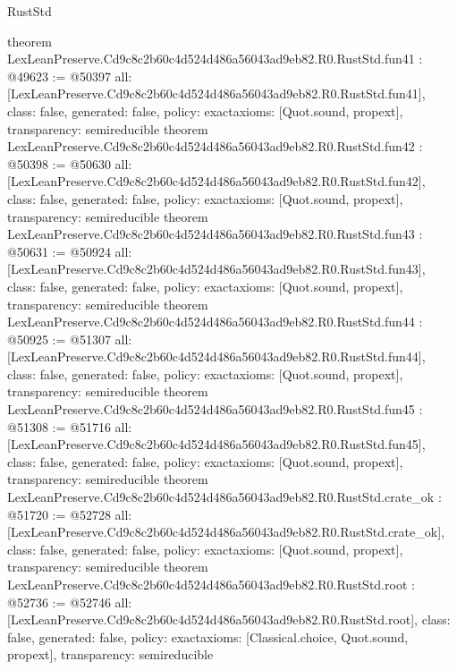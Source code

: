 \begin{lexlean}{RustStd}
\begin{coremodule}
{}
theorem LexLeanPreserve.Cd9c8c2b60c4d524d486a56043ad9eb82.R0.RustStd.fun41 : @49623 := @50397 {
  all: [LexLeanPreserve.Cd9c8c2b60c4d524d486a56043ad9eb82.R0.RustStd.fun41],
  class: false,
  generated: false,
  policy: exact{axioms: [Quot.sound, propext]},
  transparency: semireducible
}
theorem LexLeanPreserve.Cd9c8c2b60c4d524d486a56043ad9eb82.R0.RustStd.fun42 : @50398 := @50630 {
  all: [LexLeanPreserve.Cd9c8c2b60c4d524d486a56043ad9eb82.R0.RustStd.fun42],
  class: false,
  generated: false,
  policy: exact{axioms: [Quot.sound, propext]},
  transparency: semireducible
}
theorem LexLeanPreserve.Cd9c8c2b60c4d524d486a56043ad9eb82.R0.RustStd.fun43 : @50631 := @50924 {
  all: [LexLeanPreserve.Cd9c8c2b60c4d524d486a56043ad9eb82.R0.RustStd.fun43],
  class: false,
  generated: false,
  policy: exact{axioms: [Quot.sound, propext]},
  transparency: semireducible
}
theorem LexLeanPreserve.Cd9c8c2b60c4d524d486a56043ad9eb82.R0.RustStd.fun44 : @50925 := @51307 {
  all: [LexLeanPreserve.Cd9c8c2b60c4d524d486a56043ad9eb82.R0.RustStd.fun44],
  class: false,
  generated: false,
  policy: exact{axioms: [Quot.sound, propext]},
  transparency: semireducible
}
theorem LexLeanPreserve.Cd9c8c2b60c4d524d486a56043ad9eb82.R0.RustStd.fun45 : @51308 := @51716 {
  all: [LexLeanPreserve.Cd9c8c2b60c4d524d486a56043ad9eb82.R0.RustStd.fun45],
  class: false,
  generated: false,
  policy: exact{axioms: [Quot.sound, propext]},
  transparency: semireducible
}
theorem LexLeanPreserve.Cd9c8c2b60c4d524d486a56043ad9eb82.R0.RustStd.crate_ok : @51720 := @52728 {
  all: [LexLeanPreserve.Cd9c8c2b60c4d524d486a56043ad9eb82.R0.RustStd.crate_ok],
  class: false,
  generated: false,
  policy: exact{axioms: [Quot.sound, propext]},
  transparency: semireducible
}
theorem LexLeanPreserve.Cd9c8c2b60c4d524d486a56043ad9eb82.R0.RustStd.root : @52736 := @52746 {
  all: [LexLeanPreserve.Cd9c8c2b60c4d524d486a56043ad9eb82.R0.RustStd.root],
  class: false,
  generated: false,
  policy: exact{axioms: [Classical.choice, Quot.sound, propext]},
  transparency: semireducible
}


\end{coremodule}
\end{lexlean}
